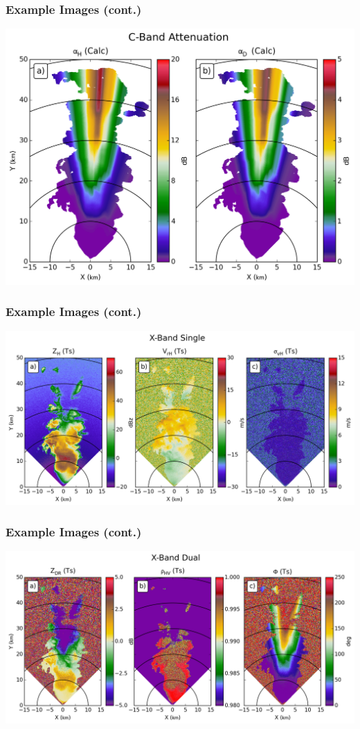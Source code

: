 \documentclass[red]{beamer}
\begin{document}
\begin{frame}
	\frametitle{Example Images (cont.)}
	\begin{center}
		\includegraphics[scale=0.4]{figures/C_Attenuation.png}
	\end{center}
\end{frame}

\begin{frame}
	\frametitle{Example Images (cont.)}
	\includegraphics[scale=0.4]{figures/X_Single.png}
\end{frame}

\begin{frame}
	\frametitle{Example Images (cont.)}
	\includegraphics[scale=0.4]{figures/X_Dual.png}
\end{frame}
\end{document}
